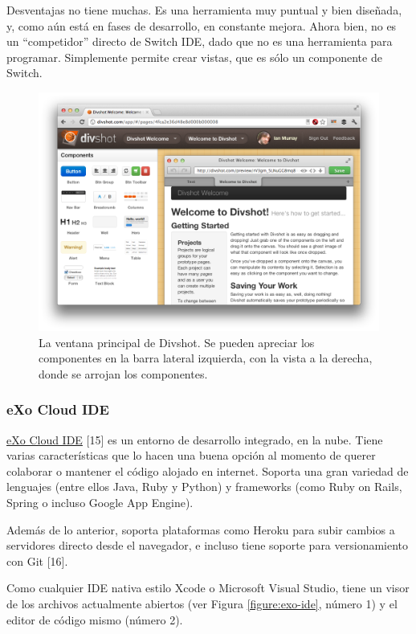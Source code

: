 \documentclass[12pt,titlepage,]{article}
\makeatletter
\def\maxwidth{\ifdim\Gin@nat@width>\linewidth\linewidth
\else\Gin@nat@width\fi}
\let\Oldincludegraphics\includegraphics
\renewcommand{\includegraphics}[1]{\Oldincludegraphics[width=\maxwidth]{#1}}
\makeatother
\begin{document}
Desventajas no tiene muchas. Es una herramienta muy puntual y bien
diseñada, y, como aún está en fases de desarrollo, en constante mejora.
Ahora bien, no es un ``competidor'' directo de Switch IDE, dado que no
es una herramienta para programar. Simplemente permite crear vistas, que
es sólo un componente de Switch.

\begin{figure}[htbp]
\centering
\includegraphics{figures/divshot-big.png}
\caption{La ventana principal de Divshot. Se pueden apreciar los
componentes en la barra lateral izquierda, con la vista a la derecha,
donde se arrojan los componentes. \label{figures:divshot}}
\end{figure}

\subsubsection{eXo Cloud IDE}

\href{http://cloud-ide.com}{eXo Cloud IDE} {[}15{]} es un entorno de
desarrollo integrado, en la nube. Tiene varias características que lo
hacen una buena opción al momento de querer colaborar o mantener el
código alojado en internet. Soporta una gran variedad de lenguajes
(entre ellos Java, Ruby y Python) y frameworks (como Ruby on Rails,
Spring o incluso Google App Engine).

Además de lo anterior, soporta plataformas como Heroku para subir
cambios a servidores directo desde el navegador, e incluso tiene soporte
para versionamiento con Git {[}16{]}.

Como cualquier IDE nativa estilo Xcode o Microsoft Visual Studio, tiene
un visor de los archivos actualmente abiertos (ver Figura
\ref{figure:exo-ide}, número 1) y el editor de código mismo (número 2).
\end{document}
